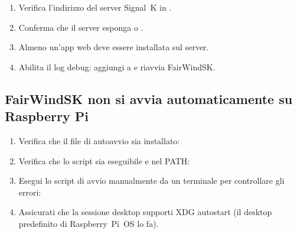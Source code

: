 \begin{enumerate}
  \item Verifica l'indirizzo del server Signal~K in .
  \item Conferma che il server esponga  o .
  \item Almeno un'app web deve essere installata sul server.
  \item Abilita il log debug: aggiungi  a 
        e riavvia FairWindSK.
\end{enumerate}

\subsection{FairWindSK non si avvia automaticamente su Raspberry Pi}

\begin{enumerate}
  \item Verifica che il file di autoavvio sia installato:
  \item Verifica che lo script  sia eseguibile e nel PATH:
  \item Esegui lo script di avvio manualmente da un terminale per controllare gli errori:
  \item Assicurati che la sessione desktop supporti XDG autostart
        (il desktop predefinito di Raspberry~Pi~OS lo fa).
\end{enumerate}

